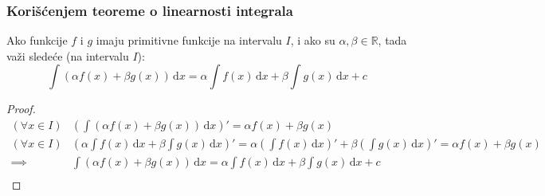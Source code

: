 	
	
\subsubsection{Korišćenjem teoreme o linearnosti integrala}
	\begin{theorem}
		Ako funkcije $f$ i $g$ imaju primitivne funkcije na intervalu $I$, i ako su $\alpha, \beta \in \mathbb{R}$, tada važi sledeće (na intervalu $I$):
		$$\int (\alpha f(x)+\beta g(x)) \, \mathrm{d}x = \alpha \int f(x)\, \mathrm{d}x + \beta \int g(x)\, \mathrm{d}x + c$$
	\end{theorem}
	\begin{proof}
		\begin{align*}
		(\forall x \in I) &\left(\int (\alpha f(x) + \beta g(x))\, \mathrm{d}x\right)'  = \alpha f(x) + \beta g(x) \\
		(\forall x \in I) &\left(\alpha \int f(x)\, \mathrm{d}x + \beta \int g(x)\, \mathrm{d}x\right)' = \alpha\left(\int f(x)\, \mathrm{d}x\right)' + \beta \left(\int g(x)\, \mathrm{d}x\right)' = \alpha f(x) + \beta g(x)\\
		\implies &\int (\alpha f(x)+\beta g(x)) \, \mathrm{d}x = \alpha \int f(x)\, \mathrm{d}x + \beta \int g(x)\, \mathrm{d}x + c\\
		\end{align*}
	\end{proof}
	
	
